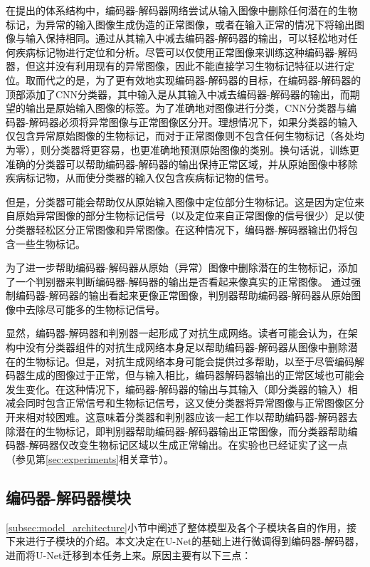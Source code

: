 在提出的体系结构中，编码器-解码器网络尝试从输入图像中删除任何潜在的生物标记，为异常的输入图像生成伪造的正常图像，或者在输入正常的情况下将输出图像与输入保持相同。通过从其输入中减去编码器-解码器的输出，可以轻松地对任何疾病标记物进行定位和分析。尽管可以仅使用正常图像来训练这种编码器-解码器，但这并没有利用现有的异常图像，因此不能直接学习生物标记特征以进行定位。取而代之的是，为了更有效地实现编码器-解码器的目标，在编码器-解码器的顶部添加了CNN分类器，其中输入是从其输入中减去编码器-解码器的输出，而期望的输出是原始输入图像的标签。为了准确地对图像进行分类，CNN分类器与编码器-解码器必须将异常图像与正常图像区分开。理想情况下，如果分类器的输入仅包含异常原始图像的生物标记，而对于正常图像则不包含任何生物标记（各处均为零），则分类器将更容易，也更准确地预测原始图像的类别。换句话说，训练更准确的分类器可以帮助编码器-解码器的输出保持正常区域，并从原始图像中移除疾病标记物，从而使分类器的输入仅包含疾病标记物的信号。

但是，分类器可能会帮助仅从原始输入图像中定位部分生物标记。这是因为定位来自原始异常图像的部分生物标记信号（以及定位来自正常图像的信号很少）足以使分类器轻松区分正常图像和异常图像。在这种情况下，编码器-解码器输出仍将包含一些生物标记。

为了进一步帮助编码器-解码器从原始（异常）图像中删除潜在的生物标记，添加了一个判别器来判断编码器-解码器的输出是否看起来像真实的正常图像。 通过强制编码器-解码器的输出看起来更像正常图像，判别器帮助编码器-解码器从原始图像中去除尽可能多的生物标记信号。

显然，编码器-解码器和判别器一起形成了对抗生成网络。读者可能会认为，在架构中没有分类器组件的对抗生成网络本身足以帮助编码器-解码器从图像中删除潜在的生物标记。但是，对抗生成网络本身可能会提供过多帮助，以至于尽管编码解码器生成的图像过于正常，但与输入相比，编码器解码器输出的正常区域也可能会发生变化。在这种情况下，编码器-解码器的输出与其输入（即分类器的输入）相减会同时包含正常信号和生物标记信号，这又使分类器将异常图像与正常图像区分开来相对较困难。这意味着分类器和判别器应该一起工作以帮助编码器-解码器去除潜在的生物标记，即判别器帮助编码器-解码器输出正常图像，而分类器帮助编码器-解码器仅改变生物标记区域以生成正常输出。在实验也已经证实了这一点（参见第\ref{sec:experiments}相关章节）。

\subsection{编码器-解码器模块}\label{subsec:encoder_decoder_model}
\ref{subsec:model_architecture}小节中阐述了整体模型及各个子模块各自的作用，接下来进行子模块的介绍。本文决定在U-Net的基础上进行微调得到编码器-解码器，进而将U-Net迁移到本任务上来。原因主要有以下三点：

